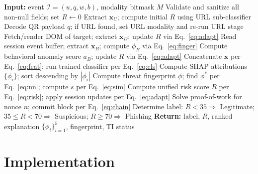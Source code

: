 \documentclass[conference]{IEEEtran}
\begin{document}
\begin{algorithmic}[1]
\STATE \textbf{Input:} event $\mathcal{I}=(u,q,w,b)$, modality bitmask $M$
\STATE Validate and sanitize all non-null fields; set $R\leftarrow 0$
  \STATE Extract $\mathbf{x}_U$; compute initial $R$ using URL sub-classifier
\ENDIF
{}
  \STATE Decode QR payload $q$; if URL found, set URL modality and re-run URL stage
\ENDIF
{}
  \STATE Fetch/render DOM of target; extract $\mathbf{x}_D$; update $R$ via Eq.~\eqref{eq:adapt}
\ENDIF
{}
  \STATE Read session event buffer; extract $\mathbf{x}_B$; compute $\phi_B$ via Eq.~\eqref{eq:finger}
  \STATE Compute behavioral anomaly score $a_B$; update $R$ via Eq.~\eqref{eq:adapt}
\ENDIF
\STATE Concatenate $\mathbf{x}$ per Eq.~\eqref{eq:feat}; run trained classifier per Eq.~\eqref{eq:cls}
\STATE Compute SHAP attributions $\{\phi_i\}$; sort descending by $|\phi_i|$
\STATE Compute threat fingerprint $\phi$; find $\phi^*$ per Eq.~\eqref{eq:nn}; compute $s$ per Eq.~\eqref{eq:sim}
\STATE Compute unified risk score $R$ per Eq.~\eqref{eq:risk}; apply session updates per Eq.~\eqref{eq:adapt}
  \STATE Solve proof-of-work for nonce $n$; commit block per Eq.~\eqref{eq:chain}
\ENDIF
\STATE Determine label: $R < 35 \Rightarrow$ Legitimate; $35 \le R < 70 \Rightarrow$ Suspicious; $R \ge 70 \Rightarrow$ Phishing
\STATE \textbf{Return:} label, $R$, ranked explanation $\{\phi_i\}_{i=1}^{5}$, fingerprint, TI status
\end{algorithmic}

\section{Implementation}
\end{document}
